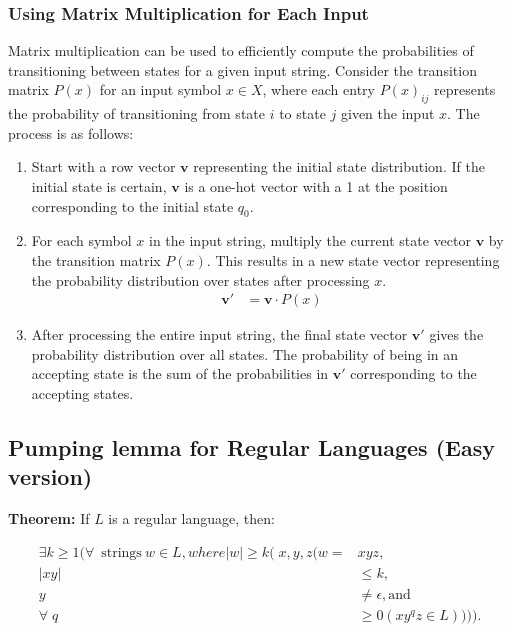 \documentclass[hidelinks,12pt]{article}
\begin{document}
\subsubsection{Using Matrix Multiplication for Each Input}
Matrix multiplication can be used to efficiently compute the probabilities of
transitioning between states for a given input string. Consider the transition
matrix $P(x)$ for an input symbol $x \in X$, where each entry $P(x)_{ij}$
represents the probability of transitioning from state $i$ to state $j$ given
the input $x$. The process is as follows:

\begin{enumerate}
    \item Start with a row vector $\mathbf{v}$ representing the initial state distribution. If the initial state is certain, $\mathbf{v}$ is a one-hot vector with a 1 at the position corresponding to the initial state $q_0$.
    \item For each symbol $x$ in the input string, multiply the current state vector $\mathbf{v}$ by the transition matrix $P(x)$. This results in a new state vector representing the probability distribution over states after processing $x$.
        \begin{align*}
            \mathbf{v}' &= \mathbf{v} \cdot P(x)
        \end{align*}
    \item After processing the entire input string, the final state vector $\mathbf{v}'$ gives the probability distribution over all states. The probability of being in an accepting state is the sum of the probabilities in $\mathbf{v}'$ corresponding to the accepting states.
\end{enumerate}

\subsection{Pumping lemma for Regular Languages (Easy version)}

\textbf{Theorem:} If $L$ is a regular language, then: 

\begin{align*}
    \exists k \ge 1 ( \forall \>\text{strings} \> w \in L, where |w| \ge k (x, y, z (w = &xyz, \\
    |xy| &\le k, \\
    y &\ne \epsilon, \text{and} \\
    \forallq &\ge 0 (xy^{q}z \in L)))). \\
\end{align*}
 
\end{document}
